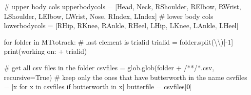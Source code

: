 \documentclass[
  letterpaper,
  DIV=11,
  numbers=noendperiod]{scrreprt}
\newenvironment{Shaded}{\begin{snugshade}}{\end{snugshade}}
\newcommand{\BuiltInTok}[1]{\textcolor[rgb]{0.00,0.23,0.31}{#1}}
\newcommand{\CharTok}[1]{\textcolor[rgb]{0.13,0.47,0.30}{#1}}
\newcommand{\CommentTok}[1]{\textcolor[rgb]{0.37,0.37,0.37}{#1}}
\newcommand{\ControlFlowTok}[1]{\textcolor[rgb]{0.00,0.23,0.31}{#1}}
\newcommand{\DecValTok}[1]{\textcolor[rgb]{0.68,0.00,0.00}{#1}}
\newcommand{\KeywordTok}[1]{\textcolor[rgb]{0.00,0.23,0.31}{#1}}
\newcommand{\NormalTok}[1]{\textcolor[rgb]{0.00,0.23,0.31}{#1}}
\newcommand{\OperatorTok}[1]{\textcolor[rgb]{0.37,0.37,0.37}{#1}}
\newcommand{\StringTok}[1]{\textcolor[rgb]{0.13,0.47,0.30}{#1}}
\newcommand{\VariableTok}[1]{\textcolor[rgb]{0.07,0.07,0.07}{#1}}
\begin{document}
\begin{Shaded}
\begin{Highlighting}[]
\CommentTok{\# upper body cols}
\NormalTok{upperbodycols }\OperatorTok{=}\NormalTok{ [}\StringTok{\textquotesingle{}Head\textquotesingle{}}\NormalTok{, }\StringTok{\textquotesingle{}Neck\textquotesingle{}}\NormalTok{, }\StringTok{\textquotesingle{}RShoulder\textquotesingle{}}\NormalTok{, }\StringTok{\textquotesingle{}RElbow\textquotesingle{}}\NormalTok{, }\StringTok{\textquotesingle{}RWrist\textquotesingle{}}\NormalTok{, }\StringTok{\textquotesingle{}LShoulder\textquotesingle{}}\NormalTok{, }\StringTok{\textquotesingle{}LElbow\textquotesingle{}}\NormalTok{, }\StringTok{\textquotesingle{}LWrist\textquotesingle{}}\NormalTok{, }\StringTok{\textquotesingle{}Nose\textquotesingle{}}\NormalTok{, }\StringTok{\textquotesingle{}RIndex\textquotesingle{}}\NormalTok{, }\StringTok{\textquotesingle{}LIndex\textquotesingle{}}\NormalTok{]}
\CommentTok{\# lower body cols}
\NormalTok{lowerbodycols }\OperatorTok{=}\NormalTok{ [}\StringTok{\textquotesingle{}RHip\textquotesingle{}}\NormalTok{, }\StringTok{\textquotesingle{}RKnee\textquotesingle{}}\NormalTok{, }\StringTok{\textquotesingle{}RAnkle\textquotesingle{}}\NormalTok{, }\StringTok{\textquotesingle{}RHeel\textquotesingle{}}\NormalTok{, }\StringTok{\textquotesingle{}LHip\textquotesingle{}}\NormalTok{, }\StringTok{\textquotesingle{}LKnee\textquotesingle{}}\NormalTok{, }\StringTok{\textquotesingle{}LAnkle\textquotesingle{}}\NormalTok{, }\StringTok{\textquotesingle{}LHeel\textquotesingle{}}\NormalTok{]}

\ControlFlowTok{for}\NormalTok{ folder }\KeywordTok{in}\NormalTok{ MTtotrack:}
    \CommentTok{\# last element is trialid}
\NormalTok{    trialid }\OperatorTok{=}\NormalTok{ folder.split(}\StringTok{\textquotesingle{}}\CharTok{\textbackslash{}\textbackslash{}}\StringTok{\textquotesingle{}}\NormalTok{)[}\OperatorTok{{-}}\DecValTok{1}\NormalTok{]}
    \BuiltInTok{print}\NormalTok{(}\StringTok{\textquotesingle{}working on:\textquotesingle{}} \OperatorTok{+}\NormalTok{ trialid)}
    
    \CommentTok{\# get all csv files in the folder}
\NormalTok{    csvfiles }\OperatorTok{=}\NormalTok{ glob.glob(folder }\OperatorTok{+} \StringTok{\textquotesingle{}/**/*.csv\textquotesingle{}}\NormalTok{, recursive}\OperatorTok{=}\VariableTok{True}\NormalTok{)}
    \CommentTok{\# keep only the ones that have butterworth in the name}
\NormalTok{    csvfiles }\OperatorTok{=}\NormalTok{ [x }\ControlFlowTok{for}\NormalTok{ x }\KeywordTok{in}\NormalTok{ csvfiles }\ControlFlowTok{if} \StringTok{\textquotesingle{}butterworth\textquotesingle{}} \KeywordTok{in}\NormalTok{ x]}
\NormalTok{    butterfile }\OperatorTok{=}\NormalTok{ csvfiles[}\DecValTok{0}\NormalTok{]}


\end{Highlighting}
\end{Shaded}
\end{document}
